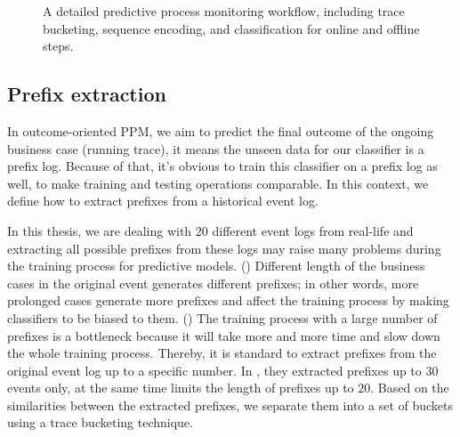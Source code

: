 \begin{figure}[htb]
	\begin{center}
		\caption[Detailed Predictive process monitoring workflow]{A detailed predictive process monitoring workflow, including trace bucketing, sequence encoding, and classification for online and offline steps. }
		\label{fig:ppmwf}
	\end{center}
\end{figure}

\subsection{Prefix extraction}
In outcome-oriented PPM, we aim to predict the final outcome of the ongoing business case (running trace), it means the unseen data for our classifier is a prefix log. Because of that, it’s obvious to train this classifier on a prefix log as well, to make training and testing operations comparable.  In this context, we define how to extract prefixes from a historical event log. 

In this thesis, we are dealing with 20 different event logs from real-life and extracting all possible prefixes from these logs may raise many problems during the training process for predictive models. () Different length of the business cases in the original event generates different prefixes; in other words,  more prolonged cases generate more prefixes and affect the training process by making classifiers to be biased to them. () The training process with a large number of prefixes is a bottleneck because it will take more and more time and slow down the whole training process.  Thereby, it is standard to extract prefixes from the original event log up to a specific number.  In \cite{leontjeva2016complex}, they extracted prefixes up to $30$ events only, at the same time \cite{verenich2016complex} limits the length of prefixes up to $20$. Based on the similarities between the extracted prefixes, we separate them into a set of buckets using a trace bucketing technique.

